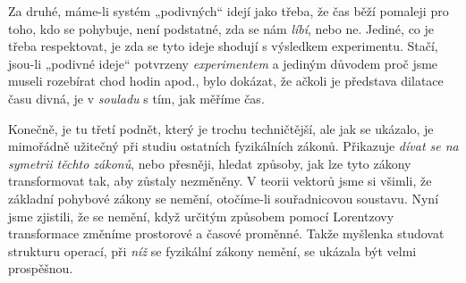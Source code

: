 {    Za druhé, máme-li systém „podivných“ idejí jako třeba, že čas běží pomaleji pro toho, kdo se 
    pohybuje, není podstatné, zda se nám \emph{líbí}, nebo ne. Jediné, co je třeba respektovat, je 
    zda se tyto ideje shodují s výsledkem experimentu. Stačí, jsou-li „podivné ideje“ potvrzeny 
    \emph{experimentem} a jediným důvodem proč jsme museli rozebírat chod hodin apod., bylo 
    dokázat, že ačkoli je představa dilatace času divná, je v \emph{souladu} s tím, jak měříme čas.
    
    Konečně, je tu třetí podnět, který je trochu techničtější, ale jak se ukázalo, je mimořádně 
    užitečný při studiu ostatních fyzikálních zákonů. Přikazuje \emph{dívat se na symetrii těchto 
    zákonů}, nebo přesněji, hledat způsoby, jak lze tyto zákony transformovat tak, aby zůstaly 
    nezměněny. V teorii vektorů jsme si všimli, že základní pohybové zákony se nemění, otočíme-li 
    souřadnicovou soustavu. Nyní jsme zjistili, že se nemění, když určitým způsobem pomocí 
    Lorentzovy transformace změníme prostorové a časové proměnné. Takže myšlenka studovat strukturu 
    operací, při \emph{níž} se fyzikální zákony nemění, se ukázala být velmi prospěšnou.
    
}
